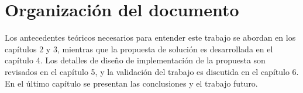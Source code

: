 \begin{intro}
\begin{itemize}
	\end{itemize}

	\section{Organización del documento}

	Los antecedentes teóricos necesarios para entender este trabajo se abordan en los capítulos 2 y 3, mientras que la propuesta de solución es desarrollada en el capítulo 4. Los detalles de diseño de implementación de la propuesta son revisados en el capítulo 5, y la validación del trabajo es discutida en el capítulo 6. En el último capítulo se presentan las conclusiones y el trabajo futuro.
\end{intro}

